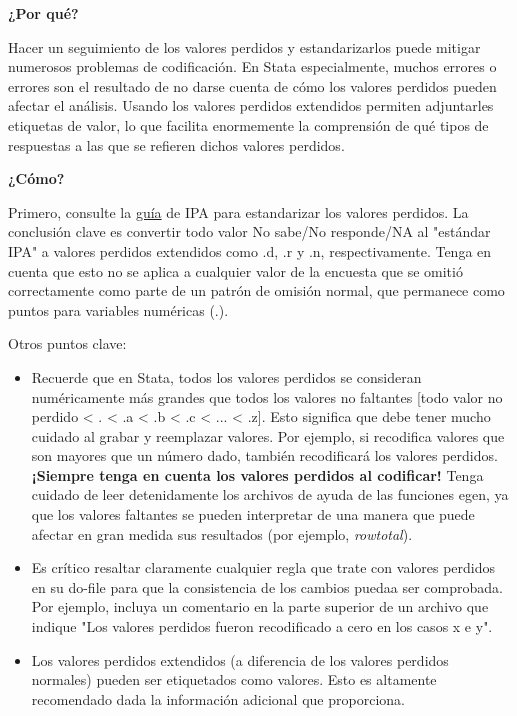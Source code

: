 \documentclass[11pt,en]{elegantpaper}
\begin{document}
\textbf{¿Por qué?}

Hacer un seguimiento de los valores perdidos y estandarizarlos puede mitigar numerosos problemas de codificación. En Stata especialmente, muchos errores o errores son el resultado de no darse cuenta de cómo los valores perdidos pueden afectar el análisis. Usando los valores perdidos extendidos permiten adjuntarles etiquetas de valor, lo que facilita enormemente la comprensión de qué tipos de respuestas a las que se refieren dichos valores perdidos. 

\textbf{¿Cómo?}

Primero, consulte la \href{http://www.poverty-action.org/research-transparency/standardizing-missing-values}{guía} de IPA para estandarizar los valores perdidos. La conclusión clave es convertir todo valor No sabe/No responde/NA al "estándar IPA" a valores perdidos extendidos como .d, .r y .n, respectivamente. Tenga en cuenta que esto no se aplica a cualquier valor de la encuesta que se omitió correctamente como parte de un patrón de omisión normal, que permanece como puntos para variables numéricas (.).

Otros puntos clave:

\begin{itemize}
	\item  Recuerde que en Stata, todos los valores perdidos se consideran numéricamente más grandes que todos los valores no                      faltantes [todo valor no perdido < . < .a < .b < .c < ... < .z]. Esto significa que debe tener mucho cuidado al grabar y                reemplazar valores. Por ejemplo, si recodifica valores que son mayores que un número dado, también recodificará los                      valores perdidos. \textbf{¡Siempre tenga en cuenta los valores perdidos al codificar!} Tenga cuidado de leer                            detenidamente los archivos de ayuda de las funciones egen, ya que los valores faltantes se pueden interpretar de una                    manera que puede afectar en gran medida sus resultados (por ejemplo, \textit{rowtotal}).
	\item  Es crítico resaltar claramente cualquier regla que trate con valores perdidos en su do-file para que la consistencia de                  los cambios puedaa ser comprobada. Por ejemplo, incluya un comentario en la parte superior de un archivo que indique                    "Los valores perdidos fueron recodificado a cero en los casos x e y".
	\item  Los valores perdidos extendidos (a diferencia de los valores perdidos normales) pueden ser etiquetados como valores. Esto                es altamente recomendado dada la información adicional que proporciona.
\end{itemize}
\end{document}
